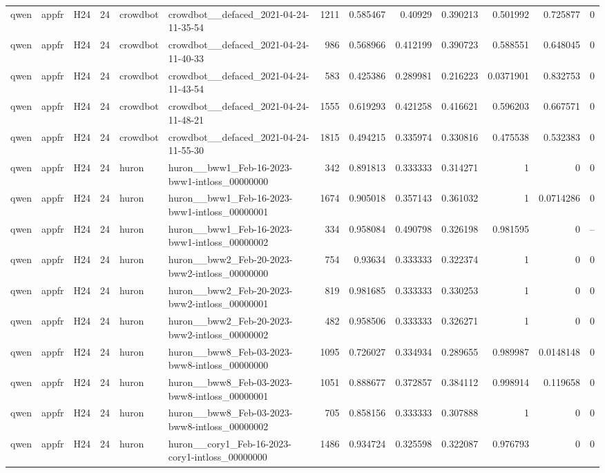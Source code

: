 \begin{longtable}{lllrllrrrrrrr}
qwen & appfr & H24 & 24 & crowdbot & crowdbot\_\_defaced\_2021-04-24-11-35-54 & 1211 & 0.585467 & 0.40929 & 0.390213 & 0.501992 & 0.725877 & 0 \\
qwen & appfr & H24 & 24 & crowdbot & crowdbot\_\_defaced\_2021-04-24-11-40-33 & 986 & 0.568966 & 0.412199 & 0.390723 & 0.588551 & 0.648045 & 0 \\
qwen & appfr & H24 & 24 & crowdbot & crowdbot\_\_defaced\_2021-04-24-11-43-54 & 583 & 0.425386 & 0.289981 & 0.216223 & 0.0371901 & 0.832753 & 0 \\
qwen & appfr & H24 & 24 & crowdbot & crowdbot\_\_defaced\_2021-04-24-11-48-21 & 1555 & 0.619293 & 0.421258 & 0.416621 & 0.596203 & 0.667571 & 0 \\
qwen & appfr & H24 & 24 & crowdbot & crowdbot\_\_defaced\_2021-04-24-11-55-30 & 1815 & 0.494215 & 0.335974 & 0.330816 & 0.475538 & 0.532383 & 0 \\
qwen & appfr & H24 & 24 & huron & huron\_\_bww1\_Feb-16-2023-bww1-intloss\_00000000 & 342 & 0.891813 & 0.333333 & 0.314271 & 1 & 0 & 0 \\
qwen & appfr & H24 & 24 & huron & huron\_\_bww1\_Feb-16-2023-bww1-intloss\_00000001 & 1674 & 0.905018 & 0.357143 & 0.361032 & 1 & 0.0714286 & 0 \\
qwen & appfr & H24 & 24 & huron & huron\_\_bww1\_Feb-16-2023-bww1-intloss\_00000002 & 334 & 0.958084 & 0.490798 & 0.326198 & 0.981595 & 0 & -- \\
qwen & appfr & H24 & 24 & huron & huron\_\_bww2\_Feb-20-2023-bww2-intloss\_00000000 & 754 & 0.93634 & 0.333333 & 0.322374 & 1 & 0 & 0 \\
qwen & appfr & H24 & 24 & huron & huron\_\_bww2\_Feb-20-2023-bww2-intloss\_00000001 & 819 & 0.981685 & 0.333333 & 0.330253 & 1 & 0 & 0 \\
qwen & appfr & H24 & 24 & huron & huron\_\_bww2\_Feb-20-2023-bww2-intloss\_00000002 & 482 & 0.958506 & 0.333333 & 0.326271 & 1 & 0 & 0 \\
qwen & appfr & H24 & 24 & huron & huron\_\_bww8\_Feb-03-2023-bww8-intloss\_00000000 & 1095 & 0.726027 & 0.334934 & 0.289655 & 0.989987 & 0.0148148 & 0 \\
qwen & appfr & H24 & 24 & huron & huron\_\_bww8\_Feb-03-2023-bww8-intloss\_00000001 & 1051 & 0.888677 & 0.372857 & 0.384112 & 0.998914 & 0.119658 & 0 \\
qwen & appfr & H24 & 24 & huron & huron\_\_bww8\_Feb-03-2023-bww8-intloss\_00000002 & 705 & 0.858156 & 0.333333 & 0.307888 & 1 & 0 & 0 \\
qwen & appfr & H24 & 24 & huron & huron\_\_cory1\_Feb-16-2023-cory1-intloss\_00000000 & 1486 & 0.934724 & 0.325598 & 0.322087 & 0.976793 & 0 & 0 \\

\end{longtable}
